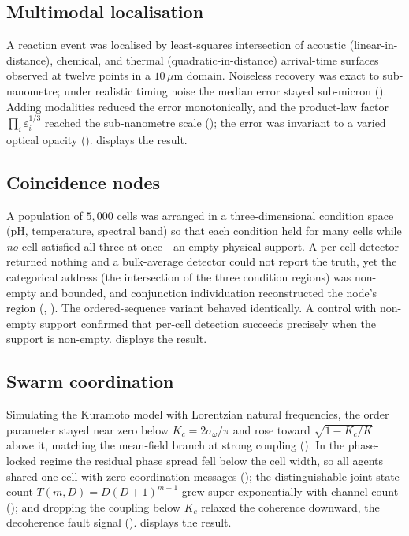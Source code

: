 \documentclass[11pt,twocolumn,a4paper]{article}
\theoremstyle{thmstyle}
\theoremstyle{definition}
\theoremstyle{remark}
\newcommand{\eps}{\varepsilon}
\begin{document}
\subsection{Multimodal localisation}

A reaction event was localised by least-squares intersection of acoustic
(linear-in-distance), chemical, and thermal (quadratic-in-distance)
arrival-time surfaces observed at twelve points in a $10\,\mu\mathrm m$
domain. Noiseless recovery was exact to sub-nanometre; under realistic
timing noise the median error stayed sub-micron ().
Adding modalities reduced the error monotonically, and the product-law
factor $\prod_i\eps_i^{1/3}$ reached the sub-nanometre scale
(); the error was invariant to a varied optical
opacity ().  displays the result.



\subsection{Coincidence nodes}

A population of $5{,}000$ cells was arranged in a three-dimensional
condition space (pH, temperature, spectral band) so that each condition
held for many cells while \emph{no} cell satisfied all three at once---an
empty physical support. A per-cell detector returned nothing and a
bulk-average detector could not report the truth, yet the categorical
address (the intersection of the three condition regions) was non-empty and
bounded, and conjunction individuation reconstructed the node's region
(, ). The ordered-sequence
variant behaved identically. A control with non-empty support confirmed
that per-cell detection succeeds precisely when the support is non-empty.
 displays the result.



\subsection{Swarm coordination}

Simulating the Kuramoto model with Lorentzian natural frequencies, the
order parameter stayed near zero below $K_c=2\sigma_\omega/\pi$ and rose
toward $\sqrt{1-K_c/K}$ above it, matching the mean-field branch at strong
coupling (). In the phase-locked regime the residual
phase spread fell below the cell width, so all agents shared one cell with
zero coordination messages (); the distinguishable
joint-state count $T(m,D)=D(D+1)^{m-1}$ grew super-exponentially with
channel count (); and dropping the coupling below
$K_c$ relaxed the coherence downward, the decoherence fault signal
().  displays the result.
\end{document}
